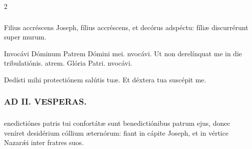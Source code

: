 \documentclass[9pt,twoside]{extarticle}
\begin{document}
\begin{multicols}{2}
\subsubsection*{}
\lettrine{F}ilius accréscens Joseph, fílius accréscens, et decórus adspéctu: fíliæ discurrérunt super murum.

\begin{tightlist}{}
\item {} Invocávi Dóminum \textred{*} Patrem Dómini mei. nvocávi.  Ut non derelínquat me in die tribulatiónis. atrem. Glória Patri. nvocávi.
\item {} Dedísti mihi protectiónem salútis tuæ.  Et déxtera tua suscépit me.
\end{tightlist}

\subsubsection*{\center \textsc{AD II. VESPERAS.}}
\begin{tightlist}{}
\item {}
\end{tightlist}

\subsubsection*{}
enedictiónes patris tui confortátæ sunt benedictiónibus patrum ejus, donec veníret desidérium cóllium æternórum: fiant in cápite Joseph, et in vértice Nazarǽi inter fratres suos.


\end{multicols}
\end{document}
